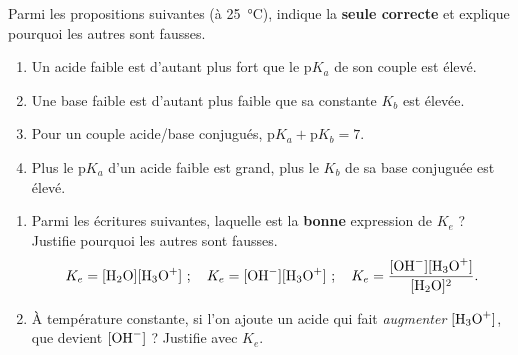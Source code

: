 \documentclass[11pt,a4paper]{article}
\begin{document}
\begin{exo}
Parmi les propositions suivantes (à \qty{25}{\celsius}), indique la \textbf{seule correcte} et explique pourquoi
les autres sont fausses.
\begin{enumerate}[label=\alph*)]
  \item Un acide faible est d'autant plus fort que le $\mathrm{p}K_a$ de son couple est élevé.
  \item Une base faible est d'autant plus faible que sa constante $K_b$ est élevée.
  \item Pour un couple acide/base conjugués, $\mathrm{p}K_a + \mathrm{p}K_b = 7$.
  \item Plus le $\mathrm{p}K_a$ d'un acide faible est grand, plus le $K_b$ de sa base conjuguée est élevé.
\end{enumerate}
\end{exo}

\begin{exo}
\begin{enumerate}[label=\alph*)]
  \item Parmi les écritures suivantes, laquelle est la \textbf{bonne} expression de $K_e$ ? Justifie pourquoi les
        autres sont fausses.
        \[ K_e = [\ce{H2O}][\ce{H3O+}]\ ;\quad K_e = [\ce{OH-}][\ce{H3O+}]\ ;\quad
           K_e = \frac{[\ce{OH-}][\ce{H3O+}]}{[\ce{H2O}]^2}. \]
  \item À température constante, si l'on ajoute un acide qui fait \emph{augmenter} $[\ce{H3O+}]$, que devient
        $[\ce{OH-}]$ ? Justifie avec $K_e$.
\end{enumerate}
\end{exo}
\end{document}
